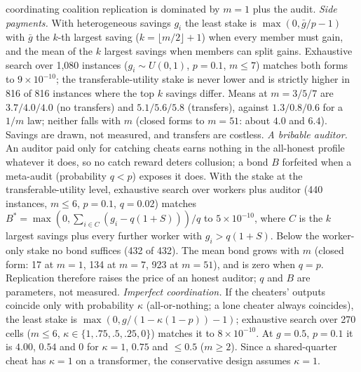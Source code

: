 \documentclass[sigconf,anonymous]{acmart}
\begin{document}
coordinating coalition replication is dominated by $m=1$ plus the audit. \emph{Side payments.} With heterogeneous savings $g_i$ the least stake is $\max(0,\bar g/p-1)$ with $\bar g$ the $k$-th largest saving ($k=\lfloor m/2\rfloor+1$) when every member must gain, and the mean of the $k$ largest savings when members can split gains. Exhaustive search over 1,080 instances ($g_i\sim U(0,1)$, $p=0.1$, $m\le7$) matches both forms to $9\times10^{-10}$; the transferable-utility stake is never lower and is strictly higher in 816 of 816 instances where the top $k$ savings differ. Means at $m=3/5/7$ are $3.7/4.0/4.0$ (no transfers) and $5.1/5.6/5.8$ (transfers), against $1.3/0.8/0.6$ for a $1/m$ law; neither falls with $m$ (closed forms to $m=51$: about $4.0$ and $6.4$). Savings are drawn, not measured, and transfers are costless. \emph{A bribable auditor.} An auditor paid only for catching cheats earns nothing in the all-honest profile whatever it does, so no catch reward deters collusion; a bond $B$ forfeited when a meta-audit (probability $q<p$) exposes it does. With the stake at the transferable-utility level, exhaustive search over workers plus auditor (440 instances, $m\le6$, $p=0.1$, $q=0.02$) matches $B^\ast=\max(0,\sum_{i\in C}(g_i-q(1+S)))/q$ to $5\times10^{-10}$, where $C$ is the $k$ largest savings plus every further worker with $g_i>q(1+S)$. Below the worker-only stake no bond suffices (432 of 432). The mean bond grows with $m$ (closed form: 17 at $m=1$, 134 at $m=7$, 923 at $m=51$), and is zero when $q=p$. Replication therefore raises the price of an honest auditor; $q$ and $B$ are parameters, not measured. \emph{Imperfect coordination.} If the cheaters' outputs coincide only with probability $\kappa$ (all-or-nothing; a lone cheater always coincides), the least stake is $\max(0,g/(1-\kappa(1-p))-1)$; exhaustive search over 270 cells ($m\le6$, $\kappa\in\{1,.75,.5,.25,0\}$) matches it to $8\times10^{-10}$. At $g=0.5$, $p=0.1$ it is $4.00$, $0.54$ and $0$ for $\kappa=1$, $0.75$ and $\le0.5$ ($m\ge2$). Since a shared-quarter cheat has $\kappa=1$ on a transformer, the conservative design assumes $\kappa=1$.
\end{document}
